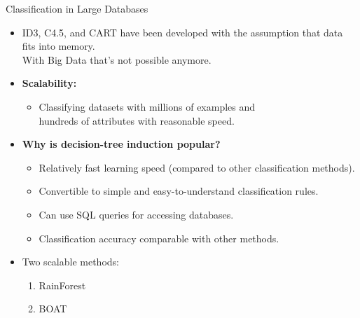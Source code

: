 \begin{frame}{Classification in Large Databases}
	\begin{itemize}
		\item ID3, C4.5, and CART have been developed with the assumption that data fits into memory.\\With Big Data that's not possible anymore.
		\item \textbf{Scalability:}
		      \begin{itemize}
			      \item Classifying datasets with millions of examples and \\ hundreds of attributes with reasonable speed.
		      \end{itemize}
		\item \textbf{Why is decision-tree induction popular?}
		      \begin{itemize}
			      \item Relatively fast learning speed (compared to other classification methods).
			      \item Convertible to simple and easy-to-understand classification rules.
			      \item Can use SQL queries for accessing databases.
			      \item Classification accuracy comparable with other methods.
		      \end{itemize}
		\item Two scalable methods:
		      \begin{enumerate}
			      \item RainForest
			      \item BOAT
		      \end{enumerate}
	\end{itemize}
\end{frame}

